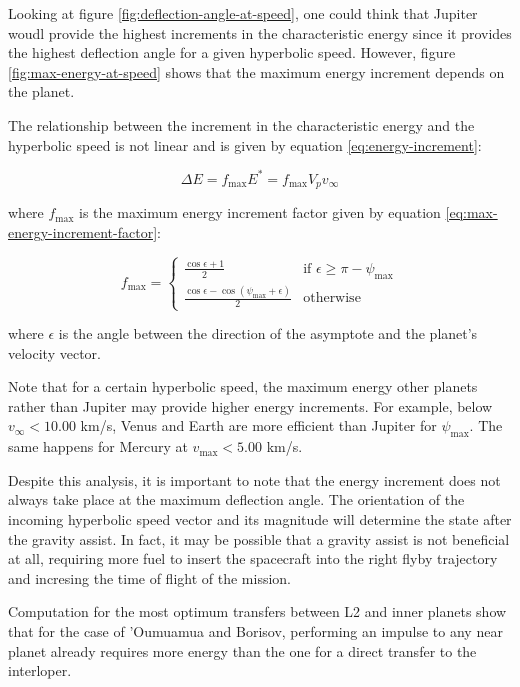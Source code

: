 Looking at figure \ref{fig:deflection-angle-at-speed}, one could think that
Jupiter woudl provide the highest increments in the characteristic energy since
it provides the highest deflection angle for a given hyperbolic speed. However,
figure \ref{fig:max-energy-at-speed} shows that the maximum energy increment
depends on the planet.

The relationship between the increment in the characteristic energy and the
hyperbolic speed is not linear and is given by equation
\ref{eq:energy-increment}:

\begin{equation}
  \Delta E = f_{\text{max}} E^{\ast} = f_{\text{max}} V_p v_{\infty}
  \label{eq:energy-increment}
\end{equation}

where $f_{\text{max}}$ is the maximum energy increment factor given by equation
\ref{eq:max-energy-increment-factor}:

\begin{equation}
  f_{\text{max}} = \begin{cases}
    \frac{\cos{\epsilon} + 1}{2}                                         & \text{if } \epsilon \geq \pi - \psi_{\max} \\
    \frac{\cos{\epsilon} - \cos{\left(\psi_{\max} + \epsilon\right)}}{2} & \text{otherwise}
  \end{cases}
  \label{eq:max-energy-increment-factor}
\end{equation}

where $\epsilon$ is the angle between the direction of the asymptote and the
planet's velocity vector.

Note that for a certain hyperbolic speed, the maximum energy other planets
rather than Jupiter may provide higher energy increments. For example, below
$v_{\infty} < 10.00$ km/s, Venus and Earth are more efficient than Jupiter for
$\psi_{\text{max}}$. The same happens for Mercury at $v_{\text{max}} < 5.00$
km/s.

Despite this analysis, it is important to note that the energy increment does
not always take place at the maximum deflection angle. The orientation of the
incoming hyperbolic speed vector and its magnitude will determine the state
after the gravity assist. In fact, it may be possible that a gravity assist is
not beneficial at all, requiring more fuel to insert the spacecraft into the
right flyby trajectory and incresing the time of flight of the mission.

Computation for the most optimum transfers between L2 and inner planets show
that for the case of 'Oumuamua and Borisov, performing an impulse to any near
planet already requires more energy than the one for a direct transfer to the
interloper.
